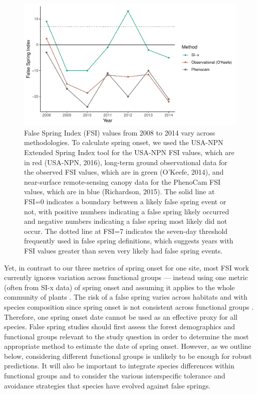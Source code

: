 \documentclass{article}\usepackage[]{graphicx}\usepackage[]{color}
\makeatletter
\def\maxwidth{ %
  \ifdim\Gin@nat@width>\linewidth
    \linewidth
  \else
    \Gin@nat@width
  \fi
}
\makeatother
\begin{document}
\begin{figure}[H]

{\centering \includegraphics[width=\maxwidth]{figure/fsifig-1} 

}

\caption[False Spring Index (FSI) values from 2008 to 2014 vary across methodologies]{False Spring Index (FSI) values from 2008 to 2014 vary across methodologies. To calculate spring onset, we used the USA-NPN Extended Spring Index tool for the USA-NPN FSI values, which are in red (USA-NPN, 2016), long-term ground observational data for the observed FSI values, which are in green (O'Keefe, 2014), and near-surface remote-sensing canopy data for the PhenoCam FSI values, which are in blue (Richardson, 2015). The solid line at FSI=0 indicates a boundary between a likely false spring event or not, with positive numbers indicating a false spring likely occurred and negative numbers indicating a false spring most likely did not occur. The dotted line at FSI=7 indicates the seven-day threshold frequently used in false spring definitions, which suggests years with FSI values greater than seven very likely had false spring events.}\label{fig:fsifig}
\end{figure}




Yet, in contrast to our three metrics of spring onset for one site, most FSI work currently ignores variation across functional groups --- instead using one metric (often from SI-x data) of spring onset and assuming it applies to the whole community of plants \citep{Allstadt2015, Marino2011, Mehdipoor2017, Peterson2014}. The risk of a false spring varies across habitats and with species composition since spring onset is not consistent across functional groups \citep{Martin2010}. Therefore, one spring onset date cannot be used as an effective proxy for all species. False spring studies should first assess the forest demographics and functional groups relevant to the study question in order to determine the most appropriate method to estimate the date of spring onset. However, as we outline below, considering different functional groups is unlikely to be enough for robust predictions. It will also be important to integrate species differences within functional groups and to consider the various interspecific tolerance and avoidance strategies that species have evolved against false springs. 
\end{document}
